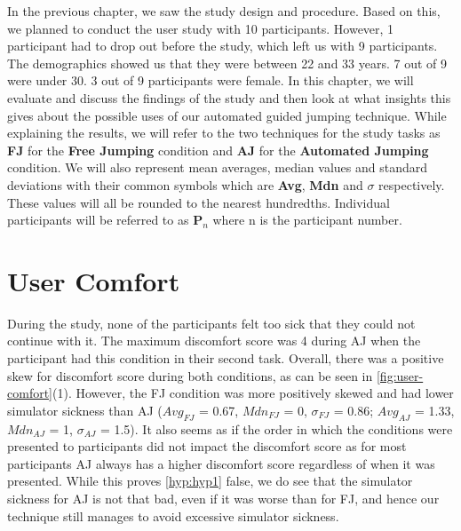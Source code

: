 \label{Chapter:Evaluation of the User Study}
In the previous chapter, we saw the study design and procedure. Based on this, we planned to conduct the user study with 10 participants. However, 1 participant had to drop out before the study, which left us with 9 participants. The demographics showed us that they were between 22 and 33 years. 7 out of 9 were under 30. 3 out of 9 participants were female. In this chapter, we will evaluate and discuss the findings of the study and then look at what insights this gives about the possible uses of our automated guided jumping technique. While explaining the results, we will refer to the two techniques for the study tasks as \textbf{FJ} for the \textbf{Free Jumping} condition and \textbf{AJ} for the \textbf{Automated Jumping} condition. We will also represent mean averages, median values and standard deviations with their common symbols which are \textbf{Avg}, \textbf{Mdn} and \textbf{$\sigma$} respectively. These values will all be rounded to the nearest hundredths. Individual participants will be referred to as \textbf{P}$_n$ where n is the participant number.

\section{User Comfort}
\label{subsection EUS: User Comfort}
During the study, none of the participants felt too sick that they could not continue with it. The maximum discomfort score was 4 during AJ when the participant had this condition in their second task. Overall, there was a positive skew for discomfort score during both conditions, as can be seen in \cref{fig:user-comfort}(1). However, the FJ condition was more positively skewed and had lower simulator sickness than AJ ($Avg_{FJ}$ = 0.67, $Mdn_{FJ}$ = 0, $\sigma_{FJ}$ = 0.86; $Avg_{AJ}$ = 1.33, $Mdn_{AJ}$ = 1, $\sigma_{AJ}$ = 1.5). It also seems as if the order in which the conditions were presented to participants did not impact the discomfort score as for most participants AJ always has a higher discomfort score regardless of when it was presented. While this proves \cref{hyp:hyp1} false, we do see that the simulator sickness for AJ is not that bad, even if it was worse than for FJ, and hence our technique still manages to avoid excessive simulator sickness.

